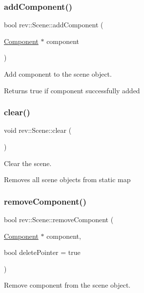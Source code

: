 \subsubsection{\texorpdfstring{addComponent()}{addComponent()}}
{\footnotesize\ttfamily bool rev\+::\+Scene\+::add\+Component (\begin{DoxyParamCaption}\item[{\mbox{\hyperlink{classrev_1_1_component}{Component}} $\ast$}]{component }\end{DoxyParamCaption})}



Add component to the scene object. 

Returns true if component successfully added \mbox{\label{classrev_1_1_scene_a6048d220281a8cd6249bf2685bd5de6c}} 
\subsubsection{\texorpdfstring{clear()}{clear()}}
{\footnotesize\ttfamily void rev\+::\+Scene\+::clear (\begin{DoxyParamCaption}{ }\end{DoxyParamCaption})}



Clear the scene. 

Removes all scene objects from static map \mbox{\label{classrev_1_1_scene_a0ef96cdbc7ef9ed34ed8cf05aba6ff97}} 
\subsubsection{\texorpdfstring{removeComponent()}{removeComponent()}}
{\footnotesize\ttfamily bool rev\+::\+Scene\+::remove\+Component (\begin{DoxyParamCaption}\item[{\mbox{\hyperlink{classrev_1_1_component}{Component}} $\ast$}]{component,  }\item[{bool}]{delete\+Pointer = {\ttfamily true} }\end{DoxyParamCaption})}



Remove component from the scene object. 

